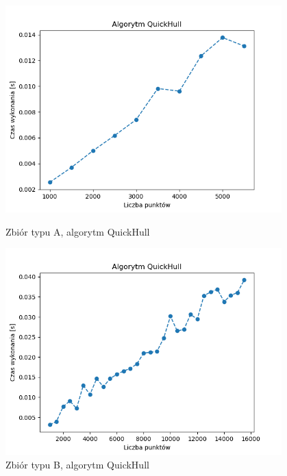 \documentclass[11pt]{article}
\theoremstyle{remark} \newtheorem{definition}{def.}
\theoremstyle{definition} \newtheorem{twierdzenie}{tw.}
\begin{document}
\begin{figure}[]
    \centering
    \begin{minipage}{0.48\textwidth}
        \centering
        \includegraphics[width=0.95\textwidth]{../tests/chmura-quickhull.png} %
        \caption{Zbiór typu A, algorytm QuickHull}
        \label{fig:chmura-quickhull}
    \end{minipage}\hfill
    \begin{minipage}{0.48\textwidth}
        \centering
        \includegraphics[width=0.95\textwidth]{../tests/okrag-quickhull.png} %
        \caption{Zbiór typu B, algorytm QuickHull}
        \label{fig:okrag-quickhull}
    \end{minipage}
\end{figure}
\end{document}
